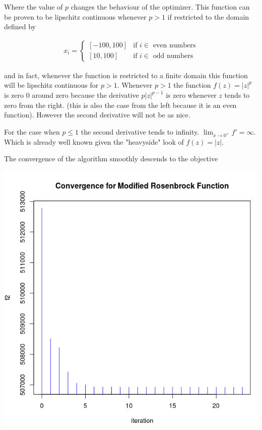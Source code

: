 Where the value of $p$ changes the behaviour of the optimizer. This function can be proven to be lipschitz continuous whenever $p > 1$ if restricted to the domain defined by  

\begin{equation}
  \begin{aligned}
    x_i = 
    \begin{cases}
      [-100, 100] & \text{if } i \in \text{ even numbers} \\
      [10, 100] & \text{if } i \in \text{ odd numbers}
    \end{cases}
  \end{aligned}
\end{equation}

and in fact, whenever the function is restricted to a finite domain this function will be lipschitz continuous for $p > 1$. Whenever $p > 1$ the function $f(z) = |z|^p$ is zero $0$ around zero because the derivative $p |z| ^{p-1}$ is zero whenever $z$ tends to zero from the right. (this is also the case from the left because it is an even function). However the second derivative will not be as nice.

For the case when $p \leq 1$ the second derivative tends to infinity. $\displaystyle \lim_{x \to 0^+} {f' = \infty}$. Which is already well known given the "heavyside" look of $f(z) = |z|$.

The convergence of the algorithm smoothly descends to the objective 

\begin{center}
\includegraphics[scale=0.3]{Figures/convergence.png}
\end{center}

